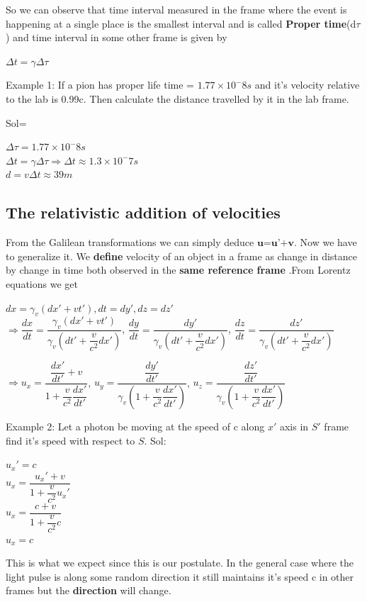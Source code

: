 \documentclass[12pt,a4paper]{article}
\numberwithin{table}{section}
\numberwithin{figure}{section}
\numberwithin{equation}{section}
\theoremstyle{remark}
\theoremstyle{definition}
\begin{document}
So we can observe that time interval measured in the frame where the event is happening at a single place is the smallest interval and is called \textbf{Proper time}(d$\tau$) and time interval in some other frame is given by
\begin{center}
    $\Delta t=\gamma \Delta\tau$
\end{center}
Example 1: If a pion has proper life time = $1.77\times10^-8s$ and it's velocity relative to the lab is 0.99c. Then calculate the distance travelled by it in the lab frame.

Sol=
\begin{center}
$\Delta\tau=1.77\times10^-8s$\\
$\Delta t=\gamma \Delta\tau \Rightarrow \Delta t\approx1.3\times10^-7s$\\
$d=v\Delta t\approx39m$

\end{center}
\subsection{The relativistic addition of velocities }
From the Galilean transformations we can simply deduce $ \textbf{u=u'+v} $. Now we have to generalize it. We \textbf{define} velocity of an object in a frame as change in distance by change in time both observed in the \textbf{same reference frame} .From Lorentz equations we get
\begin{center}
 $dx=\gamma_v(dx'+vt'), dt=dy',dz=dz' $\\
 
 $\Rightarrow \dfrac{dx}{dt}=\dfrac{\gamma_v(dx'+vt')}{\gamma_v(dt'+\dfrac{v}{c^2}dx')}$,
 $\dfrac{dy}{dt}=\dfrac{dy'}{\gamma_v(dt'+\dfrac{v}{c^2}dx')}$,
 $\dfrac{dz}{dt}=\dfrac{dz'}{\gamma_v(dt'+\dfrac{v}{c^2}dx')}$
 
 
 $\Rightarrow u_x=\dfrac{\dfrac{dx'}{dt'}+v}{1+\dfrac{v}{c^2}\dfrac{dx'}{dt'}}$,
 $ u_y= \dfrac{\dfrac{dy'}{dt'}}{\gamma_v(1+\dfrac{v}{c^2}\dfrac{dx'}{dt'})}$,
$ u_z= \dfrac{\dfrac{dz'}{dt'}}{\gamma_v(1+\dfrac{v}{c^2}\dfrac{dx'}{dt'})}$\\
\end{center}

Example 2: Let a photon be moving at the speed of c along $x'$ axis  in $S'$ frame find it's speed with respect to $S$.
Sol:\begin{center}
    $u_x'=c$ \\
    $u_x=\dfrac{u_x'+v}{1+\dfrac{v}{c^2}u_x'}$\\
    $u_x=\dfrac{c+v}{1+\dfrac{v}{c^2}c}$\\
    
    $u_x=c$\\
\end{center}
This is what we expect since this is our postulate. In the general case where the light pulse is along some random direction it still maintains it's speed c in other frames but the \textbf{ direction} will change.
\end{document}
